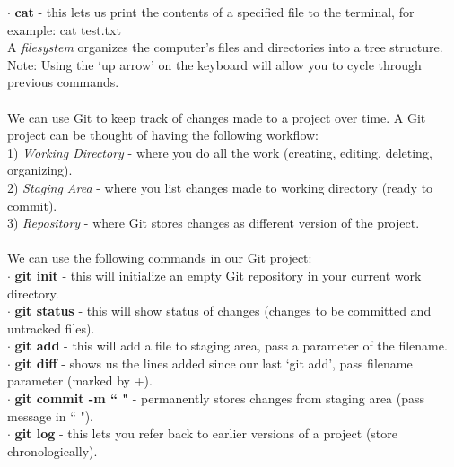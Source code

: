 \documentclass[11pt, a4paper]{article}
\begin{document}
\begin{spacing}{1.1}
	\hspace*{1.5mm} $\cdot$ \textbf{cat} - this lets us print the contents of a specified file to the terminal, for example: cat test.txt \vspace*{2mm}\\
	A \textit{filesystem} organizes the computer's files and directories into a tree structure. \\
	Note: Using the `up arrow' on the keyboard will allow you to cycle through previous commands. \\~\\
	We can use Git to keep track of changes made to a project over time. A Git project can be thought of having the following workflow: \vspace*{1mm} \\
	\hspace*{1.5mm} 1) \textit{Working Directory} - where you do all the work (creating, editing, deleting, organizing). \\
	\hspace*{1.5mm} 2) \textit{Staging Area} - where you list changes made to working directory (ready to commit). \\
	\hspace*{1.5mm} 3) \textit{Repository} - where Git stores changes as different version of the project. \\~\\
	We can use the following commands in our Git project: \\
	\hspace*{1.5mm} $\cdot$ \textbf{git init} - this will initialize an empty Git repository in your current work directory. \\
	\hspace*{1.5mm} $\cdot$ \textbf{git status} - this will show status of changes (changes to be committed and untracked files). \\
	\hspace*{1.5mm} $\cdot$ \textbf{git add} - this will add a file to staging area, pass a parameter of the filename. \\
	\hspace*{1.5mm} $\cdot$ \textbf{git diff} - shows us the lines added since our last `git add', pass filename parameter (marked by \textcolor{codegreen}{+}). \\
	\hspace*{1.5mm} $\cdot$ \textbf{git commit -m `` "} - permanently stores changes from staging area (pass message in `` "). \\
	\hspace*{1.5mm} $\cdot$ \textbf{git log} - this lets you refer back to earlier versions of a project (store chronologically). \\

\end{spacing}
\end{document}
